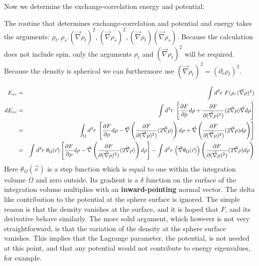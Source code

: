 \documentclass[11pt,a4paper]{report}
\begin{document}
Now we determine the exchange-correlation energy and potential:

The routine that determines exchange-correlation and potential and
energy takes the arguments: $\rho_t,\rho_s. (\vec{\nabla}\rho_t)^2
,(\vec{\nabla}\rho_s)^2,(\vec{\nabla}\rho_t)(\vec{\nabla}\rho_s)$.
Because the calculation does not include spin, only the arguments
$\rho_t$ and $(\vec{\nabla}\rho_t)^2$ will be required. Because the
density is spherical we can furthermore use
$(\vec{\nabla}\rho_t)^2=(\partial_r\rho_t)^2$.

\begin{eqnarray*}
E_{xc}&=&\int d^3r\; F(\rho,(\vec{\nabla}\rho)^2)
\\
dE_{xc}
&=&\int d^3r\; \left[
\frac{\partial F}{\partial\rho}d\rho
+\frac{\partial F}{\partial(\vec{\nabla}\rho)^2)}(2\vec{\nabla}\rho)
\vec{\nabla}d\rho\right]
\\
&=&\int_\Omega d^3r\; \left[
\frac{\partial F}{\partial\rho}d\rho
-\vec{\nabla}\left(\frac{\partial F}{\partial(\vec{\nabla}\rho)^2)}(2\vec{\nabla}\rho)\right)
d\rho
+
\vec{\nabla}\left(\frac{\partial F}{\partial(\vec{\nabla}\rho)^2)}(2\vec{\nabla}\rho)d\rho\right)
\right]
\\
&=&\int d^3r\; \theta_\Omega(\vec{r})\left[
 \frac{\partial F}{\partial\rho}d\rho
-\vec{\nabla}\left(\frac{\partial F}{\partial(\vec{\nabla}\rho)^2)}(2\vec{\nabla}\rho)\right)
d\rho\right]
-\int d^3r\;\Bigl(\vec{\nabla}\theta_\Omega(\vec{r})\Bigr)
\left(\frac{\partial F}{\partial(\vec{\nabla}\rho)^2)}
(2\vec{\nabla}\rho)d\rho\right)
\end{eqnarray*}
Here $\theta_\Omega(\vec{r})$ is a step function which is equal to one
within the integration volume $\Omega$ and zero outside. Its gradient
is a $\delta$ function on the surface of the integration volume
multiplies with an \textbf{inward-pointing} normal vector.  The delta
like contribution to the potential at the sphere surface is ignored.
The simple reason is that the density vanishes at the surface, and it
is hoped that $F$, and its derivative behave similarly.  The more
solid argument, which however is not very straightforward, is that the
variation of the density at the sphere surface vanishes. This implies
that the Lagrange parameter, the potential, is not needed at this
point, and that any potential would not contribute to energy
eigenvalues, for example.
\end{document}
